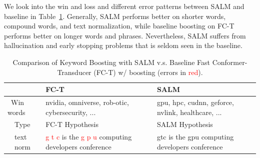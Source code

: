 \documentclass{article}
\begin{document}
We look into the win and loss and different error patterns between SALM and baseline in Table~\ref{tab:example}. Generally, SALM performs better on shorter 
 words, compound words, and text normalization, while baseline boosting on FC-T  performs better on longer words and phrases. Nevertheless, SALM suffers from hallucination and early stopping problems that is seldom seen in the baseline. 
 
\begin{table}[t]
\caption{\label{tab:example} {Comparison of Keyword Boosting with SALM v.s. Baseline Fast Conformer-Transducer (FC-T) w/ boosting (errors in \textcolor{red}{red}).} }
\begin{tabular}{lp{}|p{}|p{}}
\toprule
 &           & FC-T                                                                                                                & SALM                                                                                        \\
 \midrule
 \multicolumn{2}{p{0.08\textwidth}|}{ \ Win words} & nvidia, omniverse, rob-otic, cybersecurity, ...  & gpu, hpc,  cudnn, geforce, nvlink,  healthcare, ... \\
\midrule
\midrule
 & Type          & FC-T Hypothesis                                                                                                               & SALM Hypothesis                                                                                        \\
 \midrule
     & text norm     & \textcolor{red}{g t c} is the \textcolor{red}{g p u} computing developers conference                                                                  & gtc is the gpu computing developers conference                                              \\

\end{tabular}
\end{table}
\end{document}
